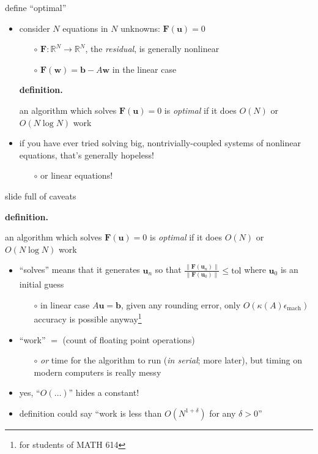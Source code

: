 \documentclass[hide notes,intlimits,usenames,dvipsnames]{beamer}
\newcommand{\RR}{\mathbb{R}}
\newcommand{\bb}{\mathbf{b}}
\newcommand{\bu}{\mathbf{u}}
\newcommand{\eps}{\epsilon}
\begin{document}
\begin{frame}{define ``optimal''}
\begin{itemize}
\item consider $N$ equations in $N$ unknowns: \qquad $\mathbf{F}(\mathbf{u}) = 0$
	\begin{itemize}
	\item[$\circ$] $\mathbf{F}:\RR^N \to \RR^N$, the \emph{residual}, is generally nonlinear
	\item[$\circ$] $\mathbf{F}(\mathbf{w}) = \mathbf{b} - A \mathbf{w}$ in the linear case
	\end{itemize}

\bigskip
\noindent \textbf{definition.}  \begin{minipage}[t]{80mm}
an algorithm which solves $\mathbf{F}(\mathbf{u}) = 0$ is \alert{\emph{optimal}} if it does $O(N)$ or $O(N\log N)$ work
\end{minipage}

\bigskip \bigskip
\item if you have ever tried solving big, nontrivially-coupled systems of nonlinear equations, that's generally hopeless!
	\begin{itemize}
	\item[$\circ$] or linear equations!
	\end{itemize}
\end{itemize}
\end{frame}


\begin{frame}{slide full of caveats}

\small
\noindent \textbf{definition.}  \begin{minipage}[t]{80mm}
an algorithm which solves $\mathbf{F}(\mathbf{u}) = 0$ is \emph{optimal} if it does $O(N)$ or $O(N\log N)$ work
\end{minipage}

\bigskip
\normalsize
\begin{itemize}
\item  ``solves'' means that it generates $\mathbf{u}_n$ so that $\frac{\|\mathbf{F}(\mathbf{u}_n)\|}{\|\mathbf{F}(\mathbf{u}_0)\|} \le \text{tol}$ where $\mathbf{u}_0$ is an initial guess
	\begin{itemize}
	\item[$\circ$] in linear case $A\bu=\bb$, given any rounding error, only $O(\kappa(A)\eps_{\text{mach}})$ accuracy is possible anyway\footnote{for students of MATH 614}
	\end{itemize}
\item ``work'' $=$ (count of floating point operations)
	\begin{itemize}
	\item[$\circ$] \emph{or} time for the algorithm to run (\emph{in serial}; more later), but timing on modern computers is really messy
	\end{itemize}
\item yes, ``$O(\dots)$'' hides a constant!
\item definition could say ``work is less than $O(N^{1+\delta})$ for any $\delta>0$''
\end{itemize}
\end{frame}
\end{document}

